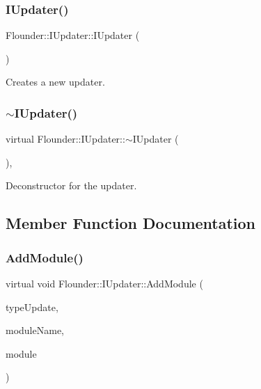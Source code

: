 \subsubsection{\texorpdfstring{I\+Updater()}{IUpdater()}}
{\footnotesize\ttfamily Flounder\+::\+I\+Updater\+::\+I\+Updater (\begin{DoxyParamCaption}{ }\end{DoxyParamCaption})\hspace{0.3cm}{\ttfamily [inline]}}



Creates a new updater. 

\mbox{\label{class_flounder_1_1_i_updater_ab1b3c5fc8bd07bbe6c5d0eb2347622fb}} 
\subsubsection{\texorpdfstring{$\sim$\+I\+Updater()}{~IUpdater()}}
{\footnotesize\ttfamily virtual Flounder\+::\+I\+Updater\+::$\sim$\+I\+Updater (\begin{DoxyParamCaption}{ }\end{DoxyParamCaption})\hspace{0.3cm}{\ttfamily [inline]}, {\ttfamily [virtual]}}



Deconstructor for the updater. 



\subsection{Member Function Documentation}
\mbox{\label{class_flounder_1_1_i_updater_a1a2b81edf11b440487c55e0784aae98d}} 
\subsubsection{\texorpdfstring{Add\+Module()}{AddModule()}}
{\footnotesize\ttfamily virtual void Flounder\+::\+I\+Updater\+::\+Add\+Module (\begin{DoxyParamCaption}\item[{Module\+Update}]{type\+Update,  }\item[{std\+::string}]{module\+Name,  }\item[{\hyperlink{class_flounder_1_1_i_module}{I\+Module} $\ast$}]{module }\end{DoxyParamCaption})\hspace{0.3cm}{\ttfamily [pure virtual]}}



